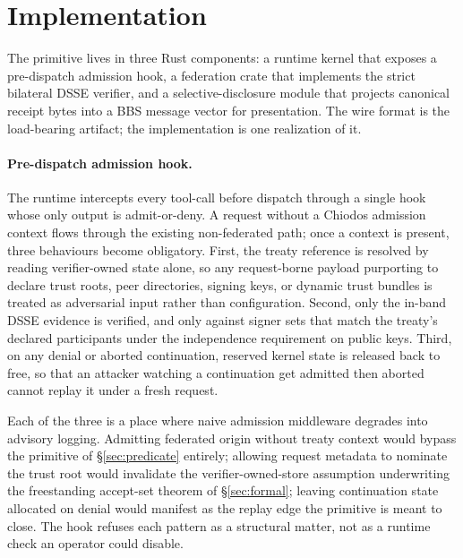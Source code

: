 \section{Implementation}
\label{sec:implementation}

The primitive lives in three Rust components: a runtime kernel that exposes a pre-dispatch admission hook, a federation crate that implements the strict bilateral DSSE verifier, and a selective-disclosure module that projects canonical receipt bytes into a BBS message vector for presentation. The wire format is the load-bearing artifact; the implementation is one realization of it.

\paragraph{Pre-dispatch admission hook.} The runtime intercepts every tool-call before dispatch through a single hook whose only output is admit-or-deny. A request without a Chiodos admission context flows through the existing non-federated path; once a context is present, three behaviours become obligatory. First, the treaty reference is resolved by reading verifier-owned state alone, so any request-borne payload purporting to declare trust roots, peer directories, signing keys, or dynamic trust bundles is treated as adversarial input rather than configuration. Second, only the in-band DSSE evidence is verified, and only against signer sets that match the treaty's declared participants under the independence requirement on public keys. Third, on any denial or aborted continuation, reserved kernel state is released back to free, so that an attacker watching a continuation get admitted then aborted cannot replay it under a fresh request.

Each of the three is a place where naive admission middleware degrades into advisory logging. Admitting federated origin without treaty context would bypass the primitive of \S\ref{sec:predicate} entirely; allowing request metadata to nominate the trust root would invalidate the verifier-owned-store assumption underwriting the freestanding accept-set theorem of \S\ref{sec:formal}; leaving continuation state allocated on denial would manifest as the replay edge the primitive is meant to close. The hook refuses each pattern as a structural matter, not as a runtime check an operator could disable.

